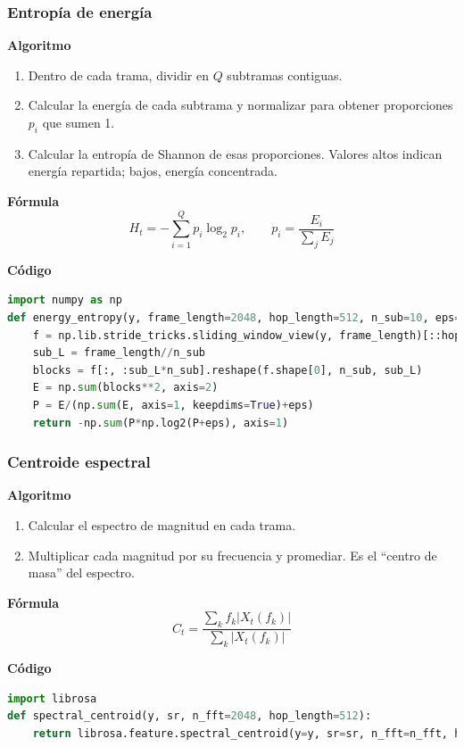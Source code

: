 \subsubsection{Entropía de energía}
\textbf{Algoritmo} \parencite{peeters2004large, giannakopoulos2014intro}
\begin{enumerate}
  \item Dentro de cada trama, dividir en \(Q\) subtramas contiguas.
  \item Calcular la energía de cada subtrama y normalizar para obtener proporciones \(p_i\) que sumen 1.
  \item Calcular la entropía de Shannon de esas proporciones. Valores altos indican energía repartida; bajos, energía concentrada.
\end{enumerate}

\textbf{Fórmula}
\[
  H_t=-\sum_{i=1}^{Q}p_i\log_2 p_i,\qquad p_i=\frac{E_i}{\sum_j E_j}
\]

\textbf{Código}
\begin{lstlisting}[language=Python, label={lst:entropy_energy_code}, caption={Entropía de energía}]
import numpy as np
def energy_entropy(y, frame_length=2048, hop_length=512, n_sub=10, eps=1e-10):
    f = np.lib.stride_tricks.sliding_window_view(y, frame_length)[::hop_length]
    sub_L = frame_length//n_sub
    blocks = f[:, :sub_L*n_sub].reshape(f.shape[0], n_sub, sub_L)
    E = np.sum(blocks**2, axis=2)
    P = E/(np.sum(E, axis=1, keepdims=True)+eps)
    return -np.sum(P*np.log2(P+eps), axis=1)
\end{lstlisting}

\subsubsection{Centroide espectral}
\textbf{Algoritmo} \parencite{tzanetakis2002musical, muller2015fmp}
\begin{enumerate}
  \item Calcular el espectro de magnitud en cada trama.
  \item Multiplicar cada magnitud por su frecuencia y promediar. Es el “centro de masa” del espectro.
\end{enumerate}

\textbf{Fórmula}
\[
  C_t=\frac{\sum_{k} f_k |X_t(f_k)|}{\sum_{k}|X_t(f_k)|}
\]

\textbf{Código}
\begin{lstlisting}[language=Python, label={lst:centroid_code}, caption={Centroide espectral}]
import librosa
def spectral_centroid(y, sr, n_fft=2048, hop_length=512):
    return librosa.feature.spectral_centroid(y=y, sr=sr, n_fft=n_fft, hop_length=hop_length)[0]
\end{lstlisting}

